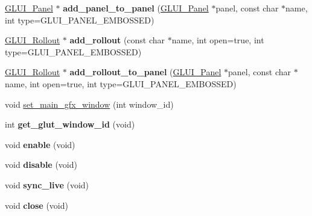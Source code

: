 \begin{DoxyCompactItemize}
\item 
\hypertarget{class_g_l_u_i_ac9d7145a5aa4e3350a8895f0baa9469c}{\hyperlink{class_g_l_u_i___panel}{G\+L\+U\+I\+\_\+\+Panel} $\ast$ {\bfseries add\+\_\+panel\+\_\+to\+\_\+panel} (\hyperlink{class_g_l_u_i___panel}{G\+L\+U\+I\+\_\+\+Panel} $\ast$panel, const char $\ast$name, int type=G\+L\+U\+I\+\_\+\+P\+A\+N\+E\+L\+\_\+\+E\+M\+B\+O\+S\+S\+E\+D)}\label{class_g_l_u_i_ac9d7145a5aa4e3350a8895f0baa9469c}

\item 
\hypertarget{class_g_l_u_i_ace34224d7288138998f0176609210a45}{\hyperlink{class_g_l_u_i___rollout}{G\+L\+U\+I\+\_\+\+Rollout} $\ast$ {\bfseries add\+\_\+rollout} (const char $\ast$name, int open=true, int type=G\+L\+U\+I\+\_\+\+P\+A\+N\+E\+L\+\_\+\+E\+M\+B\+O\+S\+S\+E\+D)}\label{class_g_l_u_i_ace34224d7288138998f0176609210a45}

\item 
\hypertarget{class_g_l_u_i_af54ce000a331eada19282db341312849}{\hyperlink{class_g_l_u_i___rollout}{G\+L\+U\+I\+\_\+\+Rollout} $\ast$ {\bfseries add\+\_\+rollout\+\_\+to\+\_\+panel} (\hyperlink{class_g_l_u_i___panel}{G\+L\+U\+I\+\_\+\+Panel} $\ast$panel, const char $\ast$name, int open=true, int type=G\+L\+U\+I\+\_\+\+P\+A\+N\+E\+L\+\_\+\+E\+M\+B\+O\+S\+S\+E\+D)}\label{class_g_l_u_i_af54ce000a331eada19282db341312849}

\item 
void \hyperlink{class_g_l_u_i_adbf3736dbd0334a33677eae1a4baa8b9}{set\+\_\+main\+\_\+gfx\+\_\+window} (int window\+\_\+id)
\item 
\hypertarget{class_g_l_u_i_abf85807ffaab858e84c4e06924fad0da}{int {\bfseries get\+\_\+glut\+\_\+window\+\_\+id} (void)}\label{class_g_l_u_i_abf85807ffaab858e84c4e06924fad0da}

\item 
\hypertarget{class_g_l_u_i_abb1c2dc07fbe72c58f4d9340980168a1}{void {\bfseries enable} (void)}\label{class_g_l_u_i_abb1c2dc07fbe72c58f4d9340980168a1}

\item 
\hypertarget{class_g_l_u_i_a0007f929ed29394f37b6032578929878}{void {\bfseries disable} (void)}\label{class_g_l_u_i_a0007f929ed29394f37b6032578929878}

\item 
\hypertarget{class_g_l_u_i_a0be00b9a4f51c8d37a90ff1258c0fc76}{void {\bfseries sync\+\_\+live} (void)}\label{class_g_l_u_i_a0be00b9a4f51c8d37a90ff1258c0fc76}

\item 
\hypertarget{class_g_l_u_i_a3d37cab3ab684fd10e2f79dd9dcf7d27}{void {\bfseries close} (void)}\label{class_g_l_u_i_a3d37cab3ab684fd10e2f79dd9dcf7d27}


\end{DoxyCompactItemize}
